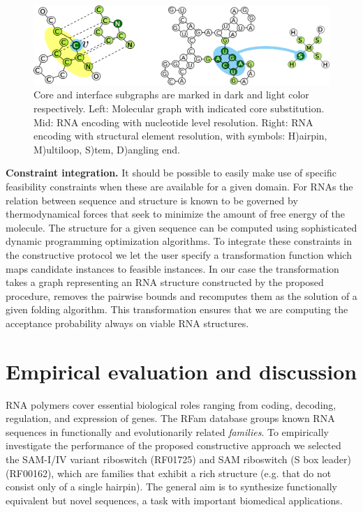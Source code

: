 \documentclass{article}
\begin{document}
\begin{figure}[ht]
      \centering
        \includegraphics[width=0.7\linewidth]{images/allcipsinone.png}
      \caption{
      Core and interface subgraphs are marked in dark and light color
      respectively. Left: Molecular graph with indicated core substitution.
      Mid: RNA encoding with nucleotide level resolution.  Right:  RNA encoding with structural element resolution, with symbols: H)airpin, M)ultiloop, S)tem, D)angling end.}
      \label{allcips}
\end{figure}


\textbf{Constraint integration.} It should be possible to easily make use of
specific feasibility constraints when these are available for a given domain.
For RNAs the relation between sequence and structure is known to be governed
by thermodynamical forces that seek to minimize the amount of free energy of
the molecule. The structure for a given sequence can be computed using
sophisticated dynamic programming optimization algorithms. To integrate these
constraints in the constructive protocol we let the user specify a
transformation function which maps candidate instances to feasible instances.
In our case the transformation takes a graph representing an RNA structure
constructed by the proposed procedure, removes the pairwise bounds and
recomputes them as the solution of a given folding algorithm. This
transformation ensures that we are computing the acceptance probability always
on viable RNA structures.


\section{Empirical evaluation and discussion}

RNA polymers cover essential biological roles ranging from coding, decoding,
regulation, and expression of genes. The RFam database \citep{rfam} groups
known RNA sequences in functionally and evolutionarily related {\em families}. To
empirically investigate the performance of the proposed constructive approach
we selected the SAM-I/IV variant riboswitch (RF01725) and SAM riboswitch (S
box leader) (RF00162), which are families that exhibit a rich structure (e.g.
that do not consist only of a single hairpin). The general aim is to
synthesize functionally equivalent but novel sequences, a task with important
biomedical applications.
\end{document}
